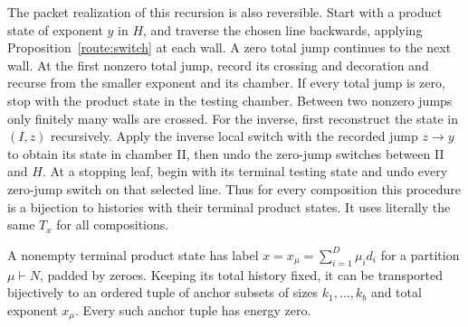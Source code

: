 The packet realization of this recursion is also reversible.  Start
with a product state of exponent $y$ in $H$, and traverse the chosen
line backwards, applying Proposition~\ref{route:switch} at each
wall.  A zero total jump continues to the next wall.  At the first
nonzero total jump, record its crossing and decoration and recurse
from the smaller exponent and its chamber.  If every total jump is
zero, stop with the product state in the testing chamber.  Between
two nonzero jumps only finitely many walls are crossed.  For the
inverse, first reconstruct the state in $(I,z)$ recursively.  Apply
the inverse local switch with the recorded jump $z\to y$ to obtain
its state in chamber II, then undo the zero-jump switches between
II and $H$.  At a stopping leaf, begin with its terminal testing
state and undo every zero-jump switch on that selected line.
Thus for every composition this procedure is a
bijection to histories with their terminal product states.  It uses
literally the same $T_x$ for all compositions.

\begin{lemma}
\label{route:return}
A nonempty terminal product state has label
$x=x_\mu=\sum_{i=1}^D\mu_i d_i$ for a partition $\mu\vdash N$,
padded by zeroes.  Keeping its total history fixed, it can be
transported bijectively to an ordered tuple of anchor subsets of
sizes $k_1,\ldots,k_b$ and total exponent $x_\mu$.  Every such
anchor tuple has energy zero.
\end{lemma}

